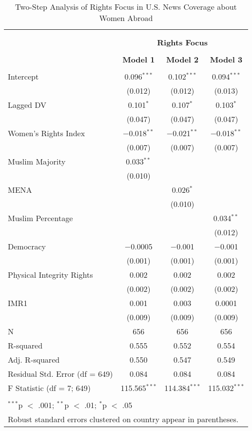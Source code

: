 
\begin{table}[!htbp] \centering 
  \caption{Two-Step Analysis of Rights Focus in U.S. News Coverage about Women Abroad} 
  \label{table:heckit} 
\begin{tabular}{@{\extracolsep{5pt}}lccc} 
\\[-1.8ex]\hline \\[-1.8ex] 
\\[-1.8ex] & \multicolumn{3}{c}{\textbf{Rights Focus}} \\ 
\\[-1.8ex] & \textbf{Model 1} & \textbf{Model 2} & \textbf{Model 3}\\ 
\hline \\[-1.8ex] 
 Intercept & 0.096$^{***}$ & 0.102$^{***}$ & 0.094$^{***}$ \\ 
  & (0.012) & (0.012) & (0.013) \\ 
  Lagged DV & 0.101$^{*}$ & 0.107$^{*}$ & 0.103$^{*}$ \\ 
  & (0.047) & (0.047) & (0.047) \\ 
  Women's Rights Index & $-$0.018$^{**}$ & $-$0.021$^{**}$ & $-$0.018$^{**}$ \\ 
  & (0.007) & (0.007) & (0.007) \\ 
  Muslim Majority & 0.033$^{**}$ &  &  \\ 
  & (0.010) &  &  \\ 
  MENA &  & 0.026$^{*}$ &  \\ 
  &  & (0.010) &  \\ 
  Muslim Percentage &  &  & 0.034$^{**}$ \\ 
  &  &  & (0.012) \\ 
  Democracy & $-$0.0005 & $-$0.001 & $-$0.001 \\ 
  & (0.001) & (0.001) & (0.001) \\ 
  Physical Integrity Rights & 0.002 & 0.002 & 0.002 \\ 
  & (0.002) & (0.002) & (0.002) \\ 
  IMR1 & 0.001 & 0.003 & 0.0001 \\ 
  & (0.009) & (0.009) & (0.009) \\ 
 N & 656 & 656 & 656 \\ 
R-squared & 0.555 & 0.552 & 0.554 \\ 
Adj. R-squared & 0.550 & 0.547 & 0.549 \\ 
Residual Std. Error (df = 649) & 0.084 & 0.084 & 0.084 \\ 
F Statistic (df = 7; 649) & 115.565$^{***}$ & 114.384$^{***}$ & 115.032$^{***}$ \\ 
\hline \\[-1.8ex] 
\multicolumn{4}{l}{$^{***}$p $<$ .001; $^{**}$p $<$ .01; $^{*}$p $<$ .05} \\ 
\multicolumn{4}{l}{Robust standard errors clustered on country appear in parentheses.} \\ 
\end{tabular} 
\end{table} 
